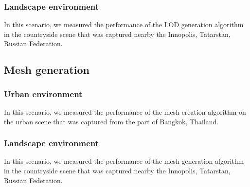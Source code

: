 
\subsubsection{Landscape environment}

In this scenario, we measured the performance of the LOD generation algorithm in the countryside scene that was captured nearby the Innopolis, Tatarstan, Russian Federation.



\subsection{Mesh generation}

\subsubsection{Urban environment}

In this scenario, we measured the performance of the mesh creation algorithm on the urban scene that was captured from the part of Bangkok, Thailand.



\subsubsection{Landscape environment}

In this scenario, we measured the performance of the mesh generation algorithm in the countryside scene that was captured nearby the Innopolis, Tatarstan, Russian Federation.


